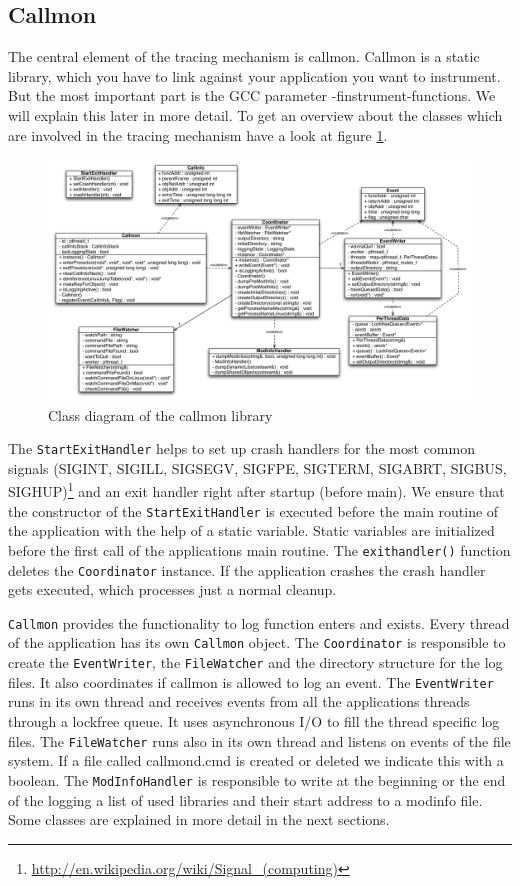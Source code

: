 \subsection{Callmon}

The central element of the tracing mechanism is callmon. Callmon is a static library, which you have to link against your application you want to instrument. But the most important part is the GCC parameter -finstrument-functions. We will explain this later in more detail. To get an overview about the classes which are involved in the tracing mechanism have a look at figure \ref{fig:unixfe_figure1}.

\begin{figure}[ht]
\centering
\includegraphics[width=18cm]{images/callmon_class_diagram}
\caption{Class diagram of the callmon library}\label{fig:unixfe_figure1}
\end{figure}

The \verb=StartExitHandler= helps to set up crash handlers for the most common signals (SIGINT, SIGILL, SIGSEGV, SIGFPE, SIGTERM, SIGABRT, SIGBUS, SIGHUP)\footnote{\url{http://en.wikipedia.org/wiki/Signal_(computing)}} and an exit handler right after startup (before main). We ensure that the constructor of the \verb=StartExitHandler= is executed before the main routine of the application with the help of a static variable. Static variables are initialized before the first call of the applications main routine. The \verb=exithandler()= function deletes the \verb=Coordinator= instance. If the application crashes the crash handler gets executed, which processes just a normal cleanup.

\verb=Callmon= provides the functionality to log function enters and exists. Every thread of the application has its own \verb=Callmon= object. The \verb=Coordinator= is responsible to create the \verb=EventWriter=, the \verb=FileWatcher= and the directory structure for the log files. It also coordinates if callmon is allowed to log an event. The \verb=EventWriter= runs in its own thread and receives events from all the applications threads through a lockfree queue. It uses asynchronous I/O to fill the thread specific log files. The \verb=FileWatcher= runs also in its own thread and listens on events of the file system. If a file called callmond.cmd is created or deleted we indicate this with a boolean. The \verb=ModInfoHandler= is responsible to write at the beginning or the end of the logging a list of used libraries and their start address to a modinfo file. Some classes are explained in more detail in the next sections.

